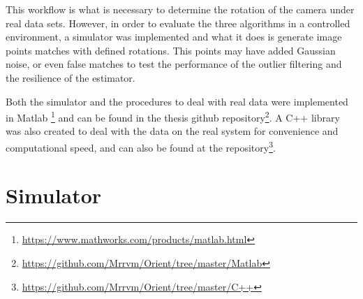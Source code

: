 This workflow is what is necessary to determine the rotation of the camera under real data sets. However, in order to evaluate the three algorithms in a controlled environment, a simulator was implemented and what it does is generate image points matches with defined rotations. This points may have added Gaussian noise, or even false matches to test the performance of the outlier filtering and the resilience of the estimator. 

Both the simulator and the procedures to deal with real data were implemented in Matlab \footnote{\href{https://www.mathworks.com/products/matlab.html}{https://www.mathworks.com/products/matlab.html}} and can be found in the thesis github repository\footnote{\href{https://github.com/Mrrvm/Orient/tree/master/Matlab}{https://github.com/Mrrvm/Orient/tree/master/Matlab}}. A C++ library was also created to deal with the data on the real system for convenience and computational speed, and can also be found at the repository\footnote{\href{https://github.com/Mrrvm/Orient/tree/master/C++}{https://github.com/Mrrvm/Orient/tree/master/C++}}.

\section{Simulator}


